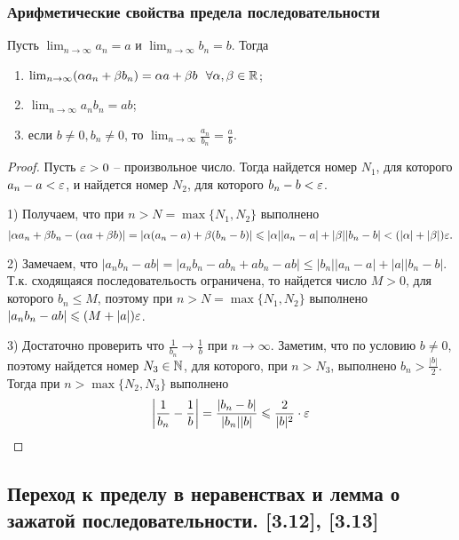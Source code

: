 \documentclass[12pt, a4paper]{article}
\begin{document}
    \subsubsection{Арифметические свойства предела последовательности}
     Пусть $ \lim_{n \to \infty} a_n = a$ и $ \lim_{n \to \infty} b_n = b$. Тогда
    \begin{enumerate}
        \item $ \lim_{n \to \infty} (\alpha a_n + \beta b_n) = \alpha a + \beta b \ \ \forall \alpha, \beta \in \mathbb{R}$;
        \item $ \lim_{n \to \infty} a_n b_n = ab$;
        \item если $b \ne 0, b_n \ne 0$, то $ \lim_{n \to \infty} \frac{a_n}{b_n} = \frac{a}{b}$.
    \end{enumerate}
    \begin{proof}
        Пусть $\varepsilon > 0$ -- произвольное число. Тогда найдется номер $N_1$, для которого $a_n - a < \varepsilon$, и найдется номер $N_2$, для которого $b_n - b < \varepsilon$.

        1) Получаем, что при $n > N = \max \{N_1, N_2\}$ выполнено
        \begin{equation*}
            |\alpha a_n + \beta b_n - (\alpha a + \beta b)| = |\alpha (a_n - a) + \beta (b_n - b)| \leqslant |\alpha| |a_n - a| + |\beta| |b_n - b| < (|\alpha| + |\beta|)\varepsilon.
        \end{equation*}

        2) Замечаем, что $|a_n b_n - ab| = |a_n b_n - a b_n + a b_n - ab| \leq |b_n||a_n - a| + |a| |b_n - b|.$ Т.к. сходящаяся последовательость ограничена, то найдется число $M > 0$, для которого $b_n \leq M$, поэтому при $n > N = \max \{N_1, N_2\}$ выполнено $|a_n b_n - ab| \leqslant (M + |a|) \varepsilon$.

    3) Достаточно проверить что $\frac{1}{b_n} \to \frac{1}{b}$ при $n \to \infty$. Заметим, что по условию $b \ne 0$, поэтому найдется номер $N_3 \in \mathbb{N}$, для которого, при $n > N_3$, выполнено $b_n > \frac{|b|}{2}$. Тогда при $n > \max \{N_2, N_3\}$ выполнено 
    \begin{equation*}
        \left|\frac{1}{b_n} - \frac{1}{b}\right| = \frac{|b_n - b|}{|b_n||b|} \leqslant \frac{2}{|b|^2} \cdot \varepsilon
    \end{equation*}
    \end{proof}
    \subsection{Переход к пределу в неравенствах и лемма о зажатой последовательности. [3.12], [3.13]}
\end{document}
